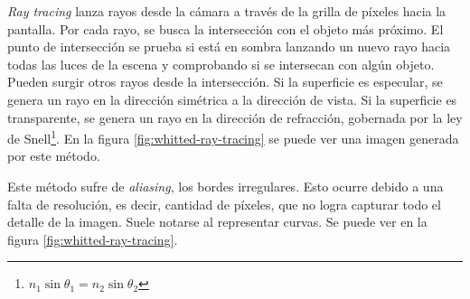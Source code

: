 \textit{Ray tracing} lanza rayos desde la cámara a través de la grilla de píxeles hacia la pantalla.
Por cada rayo, se busca la intersección con el objeto más próximo.
El punto de intersección se prueba si está en sombra lanzando un nuevo rayo hacia todas las luces de la escena y comprobando si se intersecan con algún objeto.
Pueden surgir otros rayos desde la intersección.
Si la superficie es especular, se genera un rayo en la dirección simétrica a la dirección de vista.
Si la superficie es transparente, se genera un rayo en la dirección de refracción, gobernada por la ley de Snell\footnote{$n_1 \sin{\theta_1} = n_2 \sin{\theta_2}$}.
En la figura \ref{fig:whitted-ray-tracing} se puede ver una imagen generada por este método.

Este método sufre de \textit{aliasing}, los bordes irregulares.
Esto ocurre debido a una falta de resolución, es decir, cantidad de píxeles, que no logra capturar todo el detalle de la imagen.
Suele notarse al representar curvas.
Se puede ver en la figura \ref{fig:whitted-ray-tracing}.


